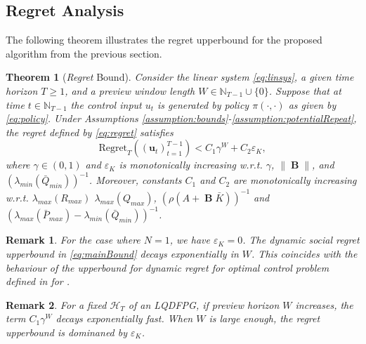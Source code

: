\documentclass[letterpaper, 10 pt, conference]{ieeeconf}  %
\DeclareMathOperator{\contB}{\mathbf{B}}
\newtheorem{remark}{Remark}
\newtheorem{theorem}{Theorem}
\begin{document}
\subsection{Regret Analysis}
The following theorem illustrates the regret upperbound for the proposed algorithm from the previous section.

\begin{theorem}[\emph{Regret} Bound]\label{thm:main}
    Consider the linear system \eqref{eq:linsys}, a given time horizon $T \geq 1$, and a preview window length $W\in \mathbb{N}_{T-1} \cup \{0\}$. Suppose that at time $t \in \mathbb{N}_{T-1}$ the control input $u_t$ is generated by policy $\pi(\cdot,\cdot)$ as given by \eqref{eq:policy}. Under Assumptions \ref{assumption:bounds}-\ref{assumption:potentialRepeat}, the regret defined by \eqref{eq:regret} satisfies
    \begin{equation}\label{eq:mainBound}
        \text{Regret}_{T}((\mathbf{u}_{t})_{t=1}^{T-1})< C_{1}\gamma^{W} + C_{2}\varepsilon_{K},
    \end{equation}
    where $\gamma \in (0,1)$ and $\varepsilon_{K}$ is monotonically increasing w.r.t. $\gamma$, $\|\contB\|$, and $(\lambda_{min}(\bar{Q}_{min}))^{-1}$. Moreover, constants $C_{1}$ and $C_{2}$ are monotonically increasing w.r.t. $\lambda_{max}(R_{max})$ $\lambda_{max}(Q_{max})$,  $(\rho(A+\contB\bar{K}))^{-1}$ and $(\lambda_{max}(\bar{P}_{max})-\lambda_{min}(\bar{Q}_{min}))^{-1}$. 
    
\end{theorem}

\begin{remark}
    For the case where $N=1$, we have $\varepsilon_{K}=0$. The \emph{dynamic social regret} upperbound in \eqref{eq:mainBound} decays exponentially in $W$. This coincides with the behaviour of the upperbound for \emph{dynamic regret} for optimal control problem defined in \cite[Equation (5)]{chen_regret_2023} for \cite[Problem 1a]{chen_regret_2023}. 
\end{remark}
\begin{remark}
    For a fixed $\mathcal{H}_{T}$ of an LQDFPG, if preview horizon $W$ increases, the term $C_{1}\gamma^{W}$ decays exponentially fast. When $W$ is large enough, the \emph{regret} upperbound is dominaned by $\varepsilon_{K}$.
\end{remark}

\end{document}
